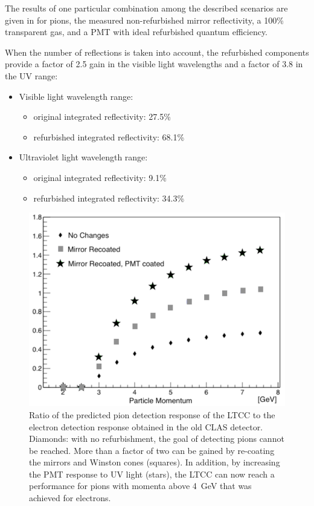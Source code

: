 The results of one particular combination among the described scenarios are given in  for pions,
the measured non-refurbished mirror reflectivity, a 100\% transparent gas, and a PMT with ideal refurbished
quantum efficiency.

When the number of reflections is taken into account, the refurbished components provide a factor of 2.5 gain in
the visible light wavelengths and a factor of 3.8 in the UV range:

\begin{itemize}
	\item Visible light wavelength range:
	\begin{itemize}
		\item original integrated reflectivity: 27.5\%
		\item refurbished integrated reflectivity: 68.1\%
	\end{itemize}
	\item Ultraviolet light wavelength range:
	\begin{itemize}
		\item original integrated reflectivity: 9.1\%
		\item refurbished integrated reflectivity: 34.3\%
	\end{itemize}
\end{itemize}

\begin{figure}[htbp]
	\centering
	\includegraphics[width=0.99\columnwidth, height=0.7\columnwidth]{img/refurbishmentGains.png}
	\caption{Ratio of the predicted pion detection response of the LTCC to the electron detection response
          obtained in the old CLAS detector. Diamonds: with no refurbishment, the goal of detecting pions cannot
          be reached. More than a factor of two can be gained by re-coating the mirrors and Winston cones
          (squares). In addition, by increasing the PMT response to UV light (stars), the LTCC can now reach
          a performance for pions with momenta above 4~GeV that was achieved for electrons.}
	\label{fig:refurbishmentGains}
\end{figure}

